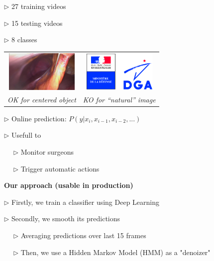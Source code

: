 \documentclass[landscape,a0paper,fontscale=0.292]{baposter}
\begin{document}
\begin{poster}
{$\triangleright$ 27 training videos

$\triangleright$ 15 testing videos

$\triangleright$ 8 classes

 \begin{tabular}{cc}
\includegraphics[width=3.5cm]{../slides/images/m2cai.jpg}
& 
\includegraphics[width=3.5cm]{logo/dga.jpg} 
\\
{\em OK for centered object} & {\em KO for ``natural'' image}
\end{tabular}

\vspace{1mm}

$\triangleright$ Online prediction: $P(y | x_i, x_{i-1}, x_{i-2}, ...)$
 

$\triangleright$ Usefull to

~~ $\triangleright$ Monitor surgeons

~~ $\triangleright$ Trigger automatic actions


\vspace{2mm}
\textbf{Our approach (usable in production)}

$\triangleright$ Firstly, we train a classifier using Deep Learning

$\triangleright$ Secondly, we smooth its predictions 

~~ $\triangleright$ Averaging predictions over last 15 frames

~~ $\triangleright$ Then, we use a Hidden Markov Model (HMM) as a "denoizer"

}

% 
% 
% 
% 
% 
% 
% 
% 
% 


\end{poster}
\end{document}

